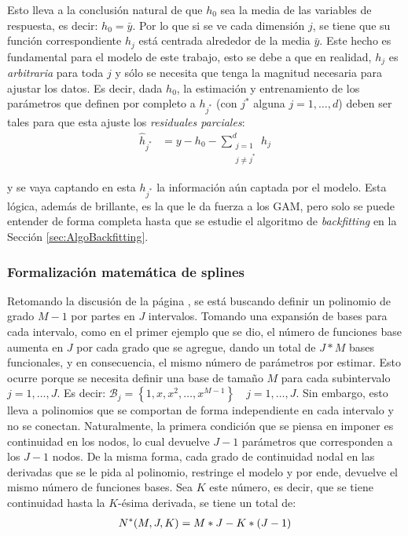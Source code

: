 \documentclass[../Main/Main.tex]{subfiles}
\begin{document}
Esto lleva a la conclusión natural de que $h_0$ sea la media de las variables de respuesta, es decir: $h_0 = \bar{y}$. Por lo que si se ve cada dimensión $j$, se tiene que su función correspondiente $h_j$ está centrada alrededor de la media $\bar{y}$. Este hecho es fundamental para el modelo de este trabajo, esto se debe a que en realidad, $h_j$ es \textit{arbitraria} para toda $j$ y sólo se necesita que tenga la magnitud necesaria para ajustar los datos. Es decir, dada $h_0$, la estimación y entrenamiento de los parámetros que definen por completo a $h_{j^*}$ (con $j^*$ alguna $j=1,\ldots,d$) deben ser tales para que esta ajuste los \textit{residuales parciales}:
\begin{align}
\hat{h}_{j^*} &= y - h_0 - \sum_{\substack{j=1\\ j \neq j^*}}^d h_j \label{ec:ResParciales}
\end{align}

y se vaya captando en esta $h_{j^*}$ la información aún captada por el modelo. Esta lógica, además de brillante, es la que le da fuerza a los GAM, pero solo se puede entender de forma completa hasta que se estudie el algoritmo de \textit{backfitting} en la Sección \ref{sec:AlgoBackfitting}. \\

\subsubsection{Formalización matemática de splines}
Retomando la discusión de la página \pageref{sec:PolisYSplines}, se está buscando definir un polinomio de grado $M-1$ por partes en $J$ intervalos. Tomando una expansión de bases para cada intervalo, como en el primer ejemplo que se dio, el número de funciones base aumenta en $J$ por cada grado que se agregue, dando un total de $J*M$ bases funcionales, y en consecuencia, el mismo número de parámetros por estimar. Esto ocurre porque se necesita definir una base de tamaño $M$ para cada subintervalo $j = 1,\ldots,J$. Es decir: $\mathcal{B}_j = \left\{1,x,x^2,\ldots,x^{M-1}\right\} \quad j = 1,\ldots,J$. Sin embargo, esto lleva a polinomios que se comportan de forma independiente en cada intervalo y no se conectan. Naturalmente, la primera condición que se piensa en imponer es continuidad en los nodos, lo cual devuelve $J-1$ parámetros que corresponden a los $J-1$ nodos. De la misma forma, cada grado de continuidad nodal en las derivadas que se le pida al polinomio, restringe el modelo y por ende, devuelve el mismo número de funciones bases. Sea $K$ este número, es decir, que se tiene continuidad hasta la $K$-ésima derivada, se tiene un total de:
\begin{align}
	N^*(M,J,K) = M*J - K*(J-1) \label{ec:NEstrella}
\end{align}
\end{document}
